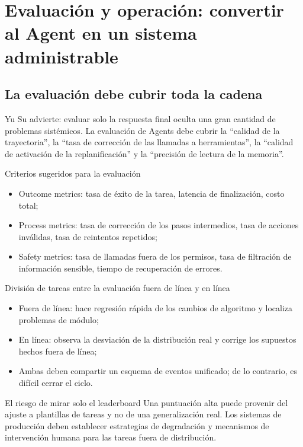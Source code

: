 \section{Evaluación y operación: convertir al Agent en un sistema administrable}

\subsection{La evaluación debe cubrir toda la cadena}
Yu Su advierte: evaluar solo la respuesta final oculta una gran cantidad de problemas sistémicos. La evaluación de Agents debe cubrir la ``calidad de la trayectoria'', la ``tasa de corrección de las llamadas a herramientas'', la ``calidad de activación de la replanificación'' y la ``precisión de lectura de la memoria''.

\begin{importantbox}{Criterios sugeridos para la evaluación}
\begin{itemize}
    \item Outcome metrics: tasa de éxito de la tarea, latencia de finalización, costo total;
    \item Process metrics: tasa de corrección de los pasos intermedios, tasa de acciones inválidas, tasa de reintentos repetidos;
    \item Safety metrics: tasa de llamadas fuera de los permisos, tasa de filtración de información sensible, tiempo de recuperación de errores.
\end{itemize}
\end{importantbox}

\begin{knowledgebox}{División de tareas entre la evaluación fuera de línea y en línea}
\begin{itemize}
    \item Fuera de línea: hace regresión rápida de los cambios de algoritmo y localiza problemas de módulo;
    \item En línea: observa la desviación de la distribución real y corrige los supuestos hechos fuera de línea;
    \item Ambas deben compartir un esquema de eventos unificado; de lo contrario, es difícil cerrar el ciclo.
\end{itemize}
\end{knowledgebox}

\begin{warningbox}{El riesgo de mirar solo el leaderboard}
Una puntuación alta puede provenir del ajuste a plantillas de tareas y no de una generalización real. Los sistemas de producción deben establecer estrategias de degradación y mecanismos de intervención humana para las tareas fuera de distribución.
\end{warningbox}

